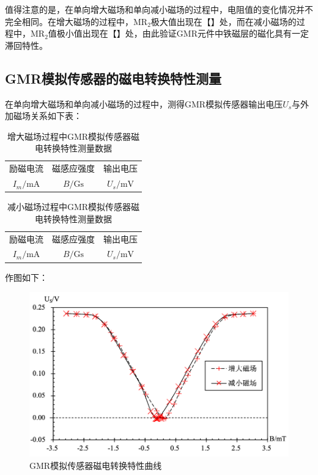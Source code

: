 \documentclass{thuemp}
\begin{document}
值得注意的是，在单向增大磁场和单向减小磁场的过程中，电阻值的变化情况并不完全相同。在增大磁场的过程中，$\mathrm{MR_2}$极大值出现在【】处，而在减小磁场的过程中，$\mathrm{MR_2}$值极小值出现在【】处，由此验证GMR元件中铁磁层的磁化具有一定滞回特性。

\subsection{GMR模拟传感器的磁电转换特性测量}

在单向增大磁场和单向减小磁场的过程中，测得GMR模拟传感器输出电压$U_s$与外加磁场关系如下表：

\begin{table}[H]
    \centering
    \captionnamefont{\wuhao\bf\heiti}
    \captiontitlefont{\wuhao\bf\heiti}
    \caption{增大磁场过程中GMR模拟传感器磁电转换特性测量数据} \label{tab:gmrsenso_incr}
    \liuhao
    \begin{tabular}{ccc}
        \toprule
        励磁电流 & 磁感应强度 & 输出电压 & \\
        $I_m/\mathrm{mA}$ & $B/\mathrm{Gs}$ & $U_s/\mathrm{mV}$ \\
        \midrule
        \bottomrule
    \end{tabular}
\end{table}

\begin{table}[H]
    \centering
    \captionnamefont{\wuhao\bf\heiti}
    \captiontitlefont{\wuhao\bf\heiti}
    \caption{减小磁场过程中GMR模拟传感器磁电转换特性测量数据} \label{tab:gmrsensor_desc}
    \liuhao
    \begin{tabular}{ccc}
        \toprule
        励磁电流 & 磁感应强度 & 输出电压 & \\
        $I_m/\mathrm{mA}$ & $B/\mathrm{Gs}$ & $U_s/\mathrm{mV}$ \\
        \midrule
        \bottomrule
    \end{tabular}
\end{table}

作图如下：

\begin{figure}[H]
    \centering
    \includegraphics[width=0.8\linewidth]{../Data/GMR-Plot-02-excel.png}
    \caption{GMR模拟传感器磁电转换特性曲线} \label{fig:gmrsensor}
\end{figure}
\end{document}
